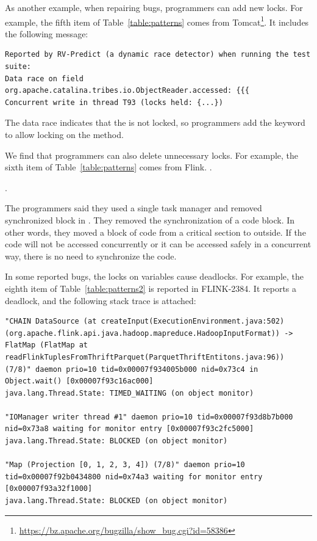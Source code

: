 As another example, when repairing bugs, programmers can add new locks. For example, the fifth item of Table~\ref{table:patterns} comes from Tomcat\footnote{\url{https://bz.apache.org/bugzilla/show\_bug.cgi?id=58386}}. It includes the following message:

\begin{lstlisting}
Reported by RV-Predict (a dynamic race detector) when running the test suite:
Data race on field org.apache.catalina.tribes.io.ObjectReader.accessed: {{{
Concurrent write in thread T93 (locks held: {...})
\end{lstlisting}

The data race indicates that the  is not locked, so programmers add the  keyword to allow locking on the method.

We find that programmers can also delete unnecessary locks. For example, the sixth item of Table~\ref{table:patterns} comes from Flink. .

.

The programmers said they used a single task manager and removed synchronized block in . They removed the synchronization of a code block. In other words, they moved a block of code from a critical section to outside. If the code will not be accessed concurrently or it can be accessed safely in a concurrent way, there is no need to synchronize the code.

In some reported bugs, the locks on variables cause deadlocks. For example, the eighth item of Table~\ref{table:patterns2} is reported in FLINK-2384. It reports a deadlock, and the following stack trace is attached:

\begin{lstlisting}
"CHAIN DataSource (at createInput(ExecutionEnvironment.java:502) (org.apache.flink.api.java.hadoop.mapreduce.HadoopInputFormat)) -> FlatMap (FlatMap at readFlinkTuplesFromThriftParquet(ParquetThriftEntitons.java:96)) (7/8)" daemon prio=10 tid=0x00007f934005b000 nid=0x73c4 in Object.wait() [0x00007f93c16ac000]
java.lang.Thread.State: TIMED_WAITING (on object monitor)

"IOManager writer thread #1" daemon prio=10 tid=0x00007f93d8b7b000 nid=0x73a8 waiting for monitor entry [0x00007f93c2fc5000]
java.lang.Thread.State: BLOCKED (on object monitor)

"Map (Projection [0, 1, 2, 3, 4]) (7/8)" daemon prio=10 tid=0x00007f92b0434800 nid=0x74a3 waiting for monitor entry [0x00007f93a32f1000]
java.lang.Thread.State: BLOCKED (on object monitor)
\end{lstlisting}

